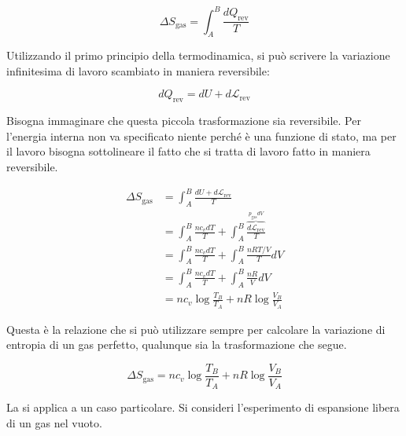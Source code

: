 \[
	\Delta S_{\text{gas} } = \int_A^B \frac{dQ_{\text{rev} } }{T}
\]

Utilizzando il primo principio della termodinamica, si può scrivere la variazione infinitesima di lavoro scambiato in maniera reversibile:

\[
	dQ_{\text{rev} } = dU + d\mathcal{L}_{\text{rev} }
\]

Bisogna immaginare che questa piccola trasformazione sia reversibile. Per l'energia interna non va specificato niente perché è una funzione di stato, ma per il lavoro bisogna sottolineare il fatto che si tratta di lavoro fatto in maniera reversibile.

\begin{equation*}
	\begin{aligned}
		\Delta S_{\text{gas} } &= \int_A^B \frac{dU + d\mathcal{L}_{\text{rev} } }{T} \\
		&= \int_A^B \frac{nc_v dT }{T} + \int_A^B \frac{\overbrace{d\mathcal{L}_{\text{rev} }}^{p_{\text{gas}}dV } }{T} \\
		&= \int_A^B \frac{nc_v dT }{T} + \int_A^B \frac{nRT/V}{T}dV \\
		&= \int_A^B \frac{nc_v dT }{T} + \int_A^B \frac{nR}{V}dV \\
		&=nc_v\log \frac{T_B }{T_A } + nR\log \frac{V_B }{V_A }
	\end{aligned}
\end{equation*}

Questa è la relazione che si può utilizzare sempre per calcolare la variazione di entropia di un gas perfetto, qualunque sia la trasformazione che segue.

\[
	\boxed{\Delta S_{\text{gas} } = nc_v\log \frac{T_B }{T_A } + nR\log \frac{V_B }{V_A }}
\]

La si applica a un caso particolare. Si consideri l'esperimento di espansione libera di un gas nel vuoto.

